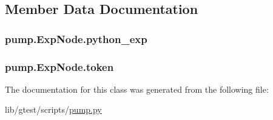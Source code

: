 \subsection{Member Data Documentation}
\hypertarget{classpump_1_1_exp_node_adccfe4778c2e34f6b2c88118c0f1587f}{
\subsubsection[{python\-\_\-exp}]{\setlength{\rightskip}{0pt plus 5cm}pump.\-Exp\-Node.\-python\-\_\-exp}}\label{classpump_1_1_exp_node_adccfe4778c2e34f6b2c88118c0f1587f}
\hypertarget{classpump_1_1_exp_node_ade05a5a32535d717dc5c194569aaf356}{
\subsubsection[{token}]{\setlength{\rightskip}{0pt plus 5cm}pump.\-Exp\-Node.\-token}}\label{classpump_1_1_exp_node_ade05a5a32535d717dc5c194569aaf356}


The documentation for this class was generated from the following file\-:\begin{DoxyCompactItemize}
\item 
lib/gtest/scripts/\hyperlink{pump_8py}{pump.\-py}\end{DoxyCompactItemize}

